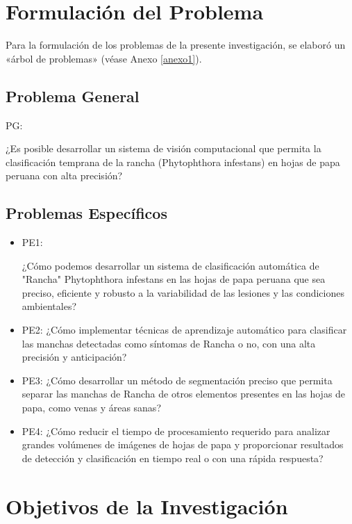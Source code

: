 \section{Formulación del Problema}
Para la formulación de los problemas de la presente investigación, se elaboró un «árbol de problemas» (véase Anexo \ref{anexo1}).

\subsection{Problema General}
PG: \newcommand{\ProblemaGeneral}{
	¿Es posible desarrollar un sistema de visión computacional que permita la clasificación temprana de la rancha (Phytophthora infestans) en hojas de papa peruana con alta precisión?
}
\ProblemaGeneral

\subsection{Problemas Específicos}
\newcommand{\Pbone}{
	¿Cómo podemos desarrollar un sistema de clasificación automática de "Rancha" Phytophthora infestans en las hojas de papa peruana que sea preciso, eficiente y robusto a la variabilidad de las lesiones y las condiciones ambientales?
	
}

\newcommand{\Pbtwo}{
¿Cómo implementar técnicas de aprendizaje automático para clasificar las manchas detectadas como síntomas de Rancha o no, con una alta precisión y anticipación?
}

\newcommand{\Pbthree}{
 ¿Cómo desarrollar un método de segmentación preciso que permita separar las manchas de Rancha de otros elementos presentes en las hojas de papa, como venas y áreas sanas?
}

\newcommand{\Pbfour}{
¿Cómo reducir el tiempo de procesamiento requerido para analizar grandes volúmenes de imágenes de hojas de papa y proporcionar resultados de detección y clasificación en tiempo real o con una rápida respuesta?
}


\begin{itemize}
	\item PE1: {\Pbone}
	\item PE2: {\Pbtwo}
	\item PE3: {\Pbthree}
	\item PE4: {\Pbfour}
\end{itemize}

\section{Objetivos de la Investigación}

